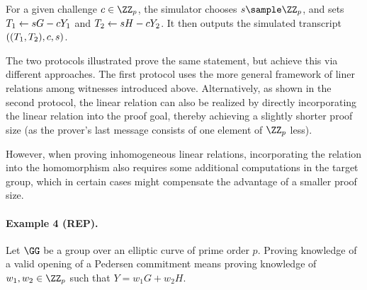 \documentclass[runningheads]{llncs}
\begin{document}
For a given challenge $c\in\ZZ_p$, the simulator chooses $s\sample\ZZ_p$, and sets $T_1\gets sG-cY_1$ and $T_2\gets sH - cY_2$.
It then outputs the simulated transcript $((T_1,T_2),c,s)$.


\begin{remark}
  The two protocols illustrated prove the same statement, but achieve this via different approaches.
  The first protocol uses the more general framework of liner relations among witnesses introduced above.
  Alternatively, as shown in the second protocol, the linear relation can also be realized by  directly incorporating the linear relation into the proof goal, thereby achieving a slightly shorter proof size (as the prover's last message consists of one element of $\ZZ_p$ less).
  
  However, when proving inhomogeneous linear relations, incorporating the relation into the homomorphism also requires some additional computations in the target group, which in certain cases might compensate the advantage of a smaller proof size.  
\end{remark}

\paragraph{Example 4 (REP).}
Let $\GG$ be a group over an elliptic curve of prime order $p$.
Proving knowledge of a valid opening of a Pedersen commitment means proving knowledge of $w_1,w_2\in\ZZ_p$ such that $Y=w_1G + w_2H$.
\end{document}
